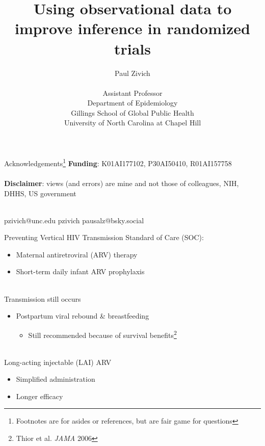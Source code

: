 \documentclass{beamer}
\title[Augmented Trials]{Using observational data to improve inference in randomized trials}
\author[Paul Zivich]{Paul Zivich \\~\\ Assistant Professor \\ Department of Epidemiology \\ Gillings School of Global Public Health \\ University of North Carolina at Chapel Hill}
\begin{document}
	
\begin{frame}[plain]
	\maketitle
\end{frame}

\begin{frame}{Acknowledgements\footnote[frame]{Footnotes are for asides or references, but are fair game for questions}}
	\textbf{Funding}: K01AI177102, P30AI50410, R01AI157758 \\~\\
	\textbf{Disclaimer}: views (and errors) are mine and not those of colleagues, NIH, DHHS, US government \\~\\
	\begin{center}
		\small
		\faEnvelope \quad pzivich@unc.edu \qquad \quad 
		\faGithub \quad pzivich \qquad \quad
		\faHashtag \quad pausalz@bsky.social
	\end{center}
\end{frame}

\begin{frame}{Preventing Vertical HIV Transmission}
	Standard of Care (SOC):
	\begin{itemize}
		\item Maternal antiretroviral (ARV) therapy 
		\item Short-term daily infant ARV prophylaxis
	\end{itemize}
	~\\
	Transmission still occurs
	\begin{itemize}
		\item Postpartum viral rebound \& breastfeeding
		\begin{itemize}
			\item Still recommended because of survival benefits\footnote[frame]{Thior et al. \textit{JAMA} 2006}
		\end{itemize}
	\end{itemize}
	~\\
	Long-acting injectable (LAI) ARV
	\begin{itemize}
		\item Simplified administration
		\item Longer efficacy
	\end{itemize}
\end{frame}
\end{document}
